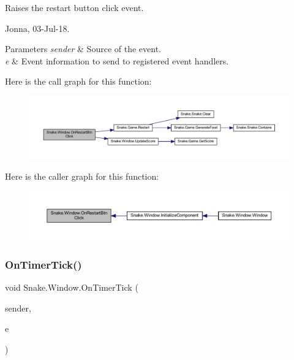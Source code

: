 Raises the restart button click event. 

Jonna, 03-\/\+Jul-\/18. 


\begin{DoxyParams}{Parameters}
{\em sender} & Source of the event. \\
\hline
{\em e} & Event information to send to registered event handlers. \\
\hline
\end{DoxyParams}
Here is the call graph for this function\+:
\nopagebreak
\begin{figure}[H]
\begin{center}
\leavevmode
\includegraphics[width=350pt]{d8/dae/class_snake_1_1_window_af9391fc232a8726ba50d284bb23271bb_cgraph}
\end{center}
\end{figure}
Here is the caller graph for this function\+:
\nopagebreak
\begin{figure}[H]
\begin{center}
\leavevmode
\includegraphics[width=350pt]{d8/dae/class_snake_1_1_window_af9391fc232a8726ba50d284bb23271bb_icgraph}
\end{center}
\end{figure}
\mbox{\label{class_snake_1_1_window_aea9a1f8d7553baa30e67b58909210415}} 
\subsubsection{\texorpdfstring{On\+Timer\+Tick()}{OnTimerTick()}}
{\footnotesize\ttfamily void Snake.\+Window.\+On\+Timer\+Tick (\begin{DoxyParamCaption}\item[{object}]{sender,  }\item[{Event\+Args}]{e }\end{DoxyParamCaption})\hspace{0.3cm}{\ttfamily [private]}}



